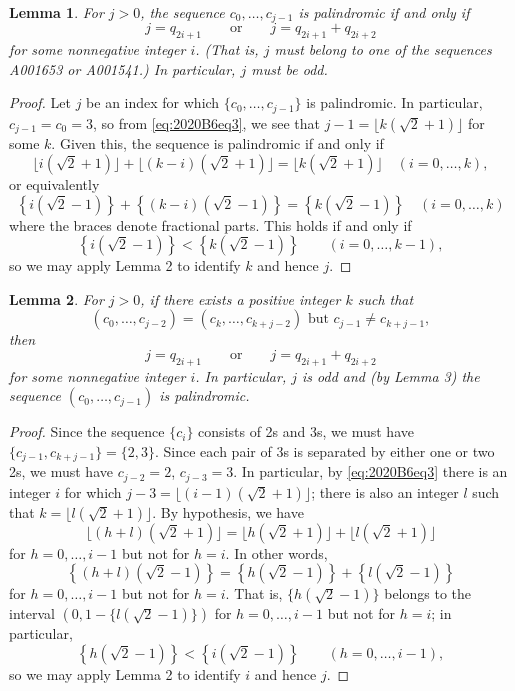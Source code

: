 \documentclass[amssymb,twocolumn,pra,10pt,aps]{revtex4-1}
\newtheorem{lemma}{Lemma}
\begin{document}
\begin{itemize}
\begin{lemma}
For $j>0$, the sequence $c_0,\dots,c_{j-1}$ is palindromic if and only if
\[
j = q_{2i+1} \qquad \mbox{or} \qquad j = q_{2i+1} + q_{2i+2}
\]
for some nonnegative integer $i$. (That is, $j$ must belong to one of the sequences A001653 or A001541.) In particular, $j$ must be odd.
\end{lemma}
\begin{proof}
Let $j$ be an index for which $\{c_0,\dots,c_{j-1}\}$ is palindromic.
In particular, $c_{j-1} = c_0 = 3$, so from \eqref{eq:2020B6eq3}, we see that $j-1 = \lfloor k(\sqrt{2}+1) \rfloor$ for some $k$.
Given this, the sequence is palindromic if and only if 
\[
\lfloor i(\sqrt{2}+1)\rfloor + \lfloor (k-i)(\sqrt{2}+1)\rfloor = \lfloor k(\sqrt{2}+1) \rfloor \quad (i=0,\dots, k),
\]
or equivalently
\[
\left\{ i(\sqrt{2}-1) \right\} + \left\{ (k-i)(\sqrt{2}-1) \right\} = \left\{ k(\sqrt{2}-1) \right\} \quad (i=0,\dots, k)
\]
where the braces denote fractional parts. This holds if and only if
\[
\left\{ i(\sqrt{2}-1) \right\} < \left\{ k(\sqrt{2}-1) \right\} \qquad (i=0,\dots,k-1),
\]
so we may apply Lemma 2 to identify $k$ and hence $j$.
\end{proof}

\begin{lemma}
For $j>0$, if there exists a positive integer $k$ such that
\[
(c_0,\dots,c_{j-2}) = (c_k,\dots,c_{k+j-2}) \mbox{ but } c_{j-1} \neq c_{k+j-1},
\]
then
\[
j = q_{2i+1} \qquad \mbox{or} \qquad j = q_{2i+1} + q_{2i+2}
\]
for some nonnegative integer $i$. In particular, $j$ is odd and (by Lemma 3) the sequence $(c_0,\dots,c_{j-1})$ is palindromic.
\end{lemma}
\begin{proof}
Since the sequence $\{c_i\}$ consists of 2s and 3s, we must have $\{c_{j-1}, c_{k+j-1}\} = \{2,3\}$.
Since each pair of 3s is separated by either one or two 2s, we must have $c_{j-2} = 2$, $c_{j-3} = 3$. In particular, 
by \eqref{eq:2020B6eq3} there is an integer $i$ for which
$j-3 = \lfloor (i-1)(\sqrt{2}+1) \rfloor$; there is also an integer $l$ such that $k = \lfloor l(\sqrt{2}+1) \rfloor$.
By hypothesis, we have
\[
\lfloor (h+l) (\sqrt{2}+1) \rfloor = \lfloor h (\sqrt{2}+1)\rfloor + \lfloor l(\sqrt{2}+1) \rfloor
\]
for $h=0,\dots,i-1$ but not for $h=i$. In other words,
\[
\left\{ (h+l) (\sqrt{2}-1) \right\} = \left\{ h (\sqrt{2}-1) \right\} + \left\{ l(\sqrt{2}-1) \right\}
\]
for $h=0,\dots,i-1$ but not for $h=i$. That is, $\{ h(\sqrt{2}-1)\}$ belongs to the interval $(0, 1-\{ l (\sqrt{2}-1)\})$
for $h=0,\dots,i-1$ but not for $h=i$; in particular,
\[
\left\{ h(\sqrt{2}-1) \right\} < \left\{ i(\sqrt{2}-1) \right\} \qquad (h=0,\dots,i-1),
\]
so we may apply Lemma 2 to identify $i$ and hence $j$.
\end{proof}


\end{itemize}
\end{document}
